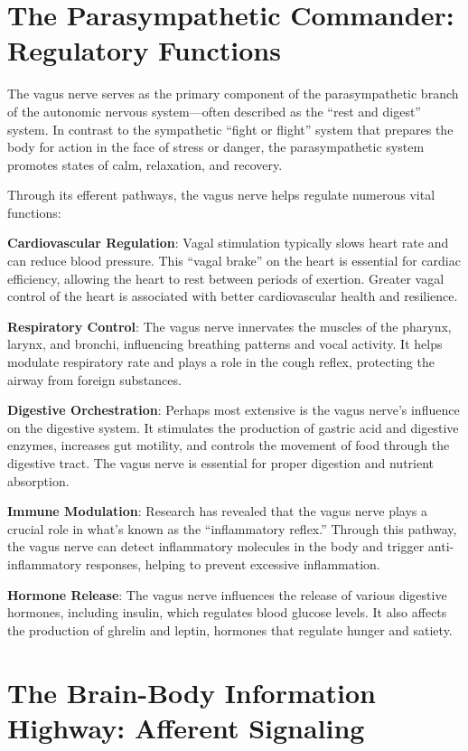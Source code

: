 \documentclass[
  Letterpaper,
]{scrbook}
\begin{document}
\section{The Parasympathetic Commander: Regulatory
Functions}\label{the-parasympathetic-commander-regulatory-functions}

The vagus nerve serves as the primary component of the parasympathetic
branch of the autonomic nervous system---often described as the ``rest
and digest'' system. In contrast to the sympathetic ``fight or flight''
system that prepares the body for action in the face of stress or
danger, the parasympathetic system promotes states of calm, relaxation,
and recovery.

Through its efferent pathways, the vagus nerve helps regulate numerous
vital functions:

\textbf{Cardiovascular Regulation}: Vagal stimulation typically slows
heart rate and can reduce blood pressure. This ``vagal brake'' on the
heart is essential for cardiac efficiency, allowing the heart to rest
between periods of exertion. Greater vagal control of the heart is
associated with better cardiovascular health and resilience.

\textbf{Respiratory Control}: The vagus nerve innervates the muscles of
the pharynx, larynx, and bronchi, influencing breathing patterns and
vocal activity. It helps modulate respiratory rate and plays a role in
the cough reflex, protecting the airway from foreign substances.

\textbf{Digestive Orchestration}: Perhaps most extensive is the vagus
nerve's influence on the digestive system. It stimulates the production
of gastric acid and digestive enzymes, increases gut motility, and
controls the movement of food through the digestive tract. The vagus
nerve is essential for proper digestion and nutrient absorption.

\textbf{Immune Modulation}: Research has revealed that the vagus nerve
plays a crucial role in what's known as the ``inflammatory reflex.''
Through this pathway, the vagus nerve can detect inflammatory molecules
in the body and trigger anti-inflammatory responses, helping to prevent
excessive inflammation.

\textbf{Hormone Release}: The vagus nerve influences the release of
various digestive hormones, including insulin, which regulates blood
glucose levels. It also affects the production of ghrelin and leptin,
hormones that regulate hunger and satiety.

\section{The Brain-Body Information Highway: Afferent
Signaling}\label{the-brain-body-information-highway-afferent-signaling}
\end{document}
